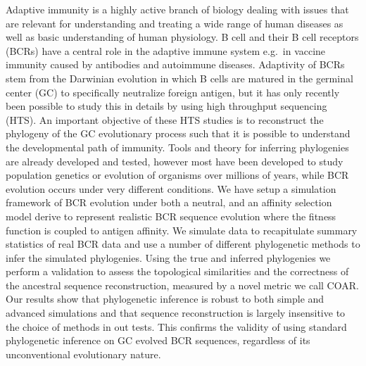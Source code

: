 Adaptive immunity is a highly active branch of biology dealing with issues that are relevant for understanding and treating a wide range of human diseases as well as basic understanding of human physiology.
B cell and their B cell receptors (BCRs) have a central role in the adaptive immune system e.g.\ in vaccine immunity caused by antibodies and autoimmune diseases.
Adaptivity of BCRs stem from the Darwinian evolution in which B cells are matured in the germinal center (GC) to specifically neutralize foreign antigen, but it has only recently been possible to study this in details by using high throughput sequencing (HTS).
An important objective of these HTS studies is to reconstruct the phylogeny of the GC evolutionary process such that it is possible to understand the developmental path of immunity.
Tools and theory for inferring phylogenies are already developed and tested, however most have been developed to study population genetics or evolution of organisms over millions of years, while BCR evolution occurs under very different conditions.
We have setup a simulation framework of BCR evolution under both a neutral, and an affinity selection model derive to represent realistic BCR sequence evolution where the fitness function is coupled to antigen affinity.
We simulate data to recapitulate summary statistics of real BCR data and use a number of different phylogenetic methods to infer the simulated phylogenies.
Using the true and inferred phylogenies we perform a validation to assess the topological similarities and the correctness of the ancestral sequence reconstruction, measured by a novel metric we call COAR.
Our results show that phylogenetic inference is robust to both simple and advanced simulations and that sequence reconstruction is largely insensitive to the choice of methods in out tests.
This confirms the validity of using standard phylogenetic inference on GC evolved BCR sequences, regardless of its unconventional evolutionary nature.
